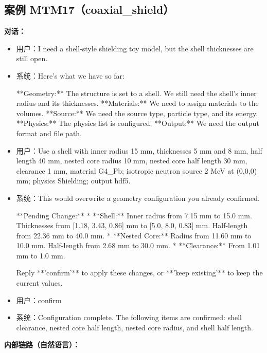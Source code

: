 \documentclass[11pt]{ctexart}
\begin{document}
\subsection{案例 MTM17（coaxial\_shield）}
\textbf{对话：}
\begin{itemize}
\item 用户：I need a shell-style shielding toy model, but the shell thicknesses are still open.
\item 系统：Here's what we have so far:

**Geometry:** The structure is set to a shell. We still need the shell's inner radius and its thicknesses.
**Materials:** We need to assign materials to the volumes.
**Source:** We need the source type, particle type, and its energy.
**Physics:** The physics list is configured.
**Output:** We need the output format and file path.
\item 用户：Use a shell with inner radius 15 mm, thicknesses 5 mm and 8 mm, half length 40 mm, nested core radius 10 mm, nested core half length 30 mm, clearance 1 mm, material G4\_Pb; isotropic neutron source 2 MeV at (0,0,0) mm; physics Shielding; output hdf5.
\item 系统：This would overwrite a geometry configuration you already confirmed.

**Pending Change:**
*   **Shell:** Inner radius from 7.15 mm to 15.0 mm. Thicknesses from [1.18, 3.43, 0.86] mm to [5.0, 8.0, 0.83] mm. Half-length from 22.36 mm to 40.0 mm.
*   **Nested Core:** Radius from 11.60 mm to 10.0 mm. Half-length from 2.68 mm to 30.0 mm.
*   **Clearance:** From 1.01 mm to 1.0 mm.

Reply **'confirm'** to apply these changes, or **'keep existing'** to keep the current values.
\item 用户：confirm
\item 系统：Configuration complete. The following items are confirmed: shell clearance, nested core half length, nested core radius, and shell half length.
\end{itemize}
\textbf{内部链路（自然语言）：}
\end{document}
